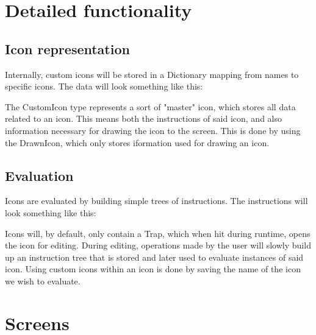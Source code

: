 \documentclass{article}
\begin{document}
    \section{Detailed functionality}
        \subsection{Icon representation}
            Internally, custom icons will be stored in a Dictionary mapping from names to specific icons. The data
            will look something like this:
            

            \noindent
            The CustomIcon type represents a sort of "master" icon, which stores all data related to an icon. This
            means both the instructions of said icon, and also information necessary for drawing the icon to the screen.
            This is done by using the DrawnIcon, which only stores iformation used for drawing an icon.

        \subsection{Evaluation}
            Icons are evaluated by building simple trees of instructions. The instructions will look something like
            this:
            

            \noindent
            Icons will, by default, only contain a Trap, which when hit during runtime, opens the icon for editing.
            During editing, operations made by the user will slowly build up an instruction tree that is stored and
            later used to evaluate instances of said icon. Using custom icons within an icon is done by saving the name
            of the icon we wish to evaluate.


    \section{Screens}
\end{document}
